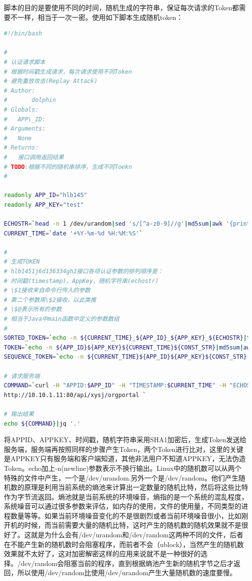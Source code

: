 \documentclass[12pt]{book}
\numberwithin{dummy}{section}
\theoremstyle{ocrenumbox}
\theoremstyle{blacknumex}
\theoremstyle{blacknumbox}
\theoremstyle{ocrenum}
\begin{document}
脚本的目的是要使用不同的时间，随机生成的字符串，保证每次请求的Token都需要不一样，相当于一次一密。使用如下脚本生成随机token：

\begin{lstlisting}[language=Bash]
#!/bin/bash

#
# 认证请求脚本
# 根据时间戳生成请求，每次请求使用不同Token
# 避免重放攻击(Replay Attack)
# Author:
# 		dolphin
# Globals:
#   APP\_ID:
# Arguments:
#   None
# Returns:
#   接口调用返回结果
# TODO:根据不同的随机串排序，生成不同Toekn
#

readonly APP_ID="hlb145"
readonly APP_KEY="test"

ECHOSTR=`head -n 1 /dev/urandom|sed 's/[^a-z0-9]//g'|md5sum|awk '{print $1}'`
CURRENT_TIME=`date '+%Y-%m-%d %H:%M:%S'`

#
# 生成TOKEN
# hlb1451j6d136334gh2接口各项认证参数的排列顺序是：
# 时间戳(timestamp)、AppKey、随机字符串(echostr)
# \$1接收来自命令行传入的参数
# 第二个参数用\$2接收，以此类推
# \$@表示所有的参数
# 相当于Java中main函数中定义的参数数组
#
SORTED_TOKEN=`echo -n ${CURRENT_TIME}_${APP_ID}_${APP_KEY}_${ECHOSTR}|tr '_' '\t'|sort|tr -d '\011'`
TOKEN=`echo -n ${APP_ID}${APP_KEY}${CURRENT_TIME}${CONST_STR}|md5sum|awk '{print $1}'`
SEQUENCE_TOKEN=`echo -n ${CURRENT_TIME}${APP_ID}${APP_KEY}${CONST_STR}|shasum -a 1|awk '{print $1}'`

# 请求服务端
COMMAND=`curl -H "APPID:$APP_ID" -H "TIMESTAMP:$CURRENT_TIME" -H "ECHOSTR:$CONST_STR" -H "TOKEN:$SEQUENCE_TOKEN" \
http://10.10.1.11:80/api/xysj/orgportal `

# 输出结果
echo ${COMMAND}|jq '.'
\end{lstlisting}

将APPID、APPKEY、时间戳，随机字符串采用SHA1加密后，生成Token发送给服务端，服务端再按照同样的步骤产生Token，两个Token进行比对，这里的关键是APPKEY只有服务端和客户端知道，其他非法用户不知道APPKEY，无法伪造Token。echo加上-n(newline)参数表示不换行输出。Linux中的随机数可以从两个特殊的文件中产生，一个是/dev/urandom.另外一个是/dev/random。他们产生随机数的原理是利用当前系统的熵池来计算出一定数量的随机比特，然后将这些比特作为字节流返回。熵池就是当前系统的环境噪音，熵指的是一个系统的混乱程度，系统噪音可以通过很多参数来评估，如内存的使用，文件的使用量，不同类型的进程数量等等。如果当前环境噪音变化的不是很剧烈或者当前环境噪音很小，比如刚开机的时候，而当前需要大量的随机比特，这时产生的随机数的随机效果就不是很好了。这就是为什么会有/dev/urandom和/dev/random这两种不同的文件，后者在不能产生新的随机数时会阻塞程序，而前者不会（ublock），当然产生的随机数效果就不太好了，这对加密解密这样的应用来说就不是一种很好的选择。/dev/random会阻塞当前的程序，直到根据熵池产生新的随机字节之后才返回，所以使用/dev/random比使用/dev/urandom产生大量随机数的速度要慢。
\end{document}
